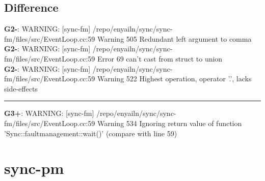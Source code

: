 \documentclass[12pt,twoside]{article}
\begin{document}
\subsection{Difference} 
\textbf{G2-}: WARNING: [sync-fm] /repo/enyailn/sync/sync-fm/files/src/EventLoop.cc:59 Warning 505 Redundant left argument to comma\\ 
\textbf{G2-}: WARNING: [sync-fm] /repo/enyailn/sync/sync-fm/files/src/EventLoop.cc:59 Error 69 can't cast from struct to union\\ 
\textbf{G2-}: WARNING: [sync-fm] /repo/enyailn/sync/sync-fm/files/src/EventLoop.cc:59 Warning 522 Highest operation, operator '.', lacks side-effects\\ 
\rule{\textwidth}{0.5pt} 
\textbf{G3+}: WARNING: [sync-fm] /repo/enyailn/sync/sync-fm/files/src/EventLoop.cc:59 Warning 534 Ignoring return value of function 'Sync::faultmanagement::wait()' (compare with line 59)\\ 
 
\section{sync-pm}
 
\end{document}
